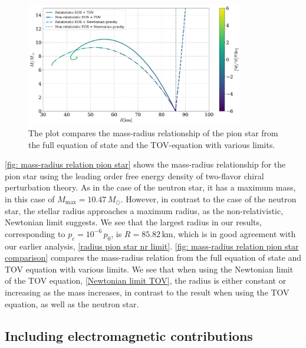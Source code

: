 \begin{figure}[!h]
    \centering
    \includegraphics[width=0.85\textwidth]{../scripts/figurer/pion_star/mass_radius_comparison.pdf}
    \caption{
        The plot compares the mass-radius relationship of the pion star from the full equation of state and the TOV-equation with various limits.
        }
        \label{fig: mass-radius relation pion star comparison}
\end{figure}


\autoref{fig: mass-radius relation pion star} shows the mass-radius relationship for the pion star using the leading order free energy density of two-flavor chiral perturbation theory.
As in the case of the neutron star, it has a maximum mass, in this case of $M_\text{max} = 10.47\, M_\odot$.
However, in contrast to the case of the neutron star, the stellar radius approaches a maximum radius, as the non-relativistic, Newtonian limit suggests.
We see that the largest radius in our results, corresponding to  $p_c = 10^{-6} \, p_0$, is $R = 85.82 \, \text{km}$, which is in good agreement with our earlier analysis, \autoref{radius pion star nr limit}.
\autoref{fig: mass-radius relation pion star comparison} compares the mass-radius relation from the full equation of state and TOV equation with various limits.
We see that when using the Newtonian limit of the TOV equation, \autoref{Newtonian limit TOV}, the radius is either constant or increasing as the mass increases, in contrast to the result when using the TOV equation, as well as the neutron star.




\FloatBarrier
\subsection{Including electromagnetic contributions}

